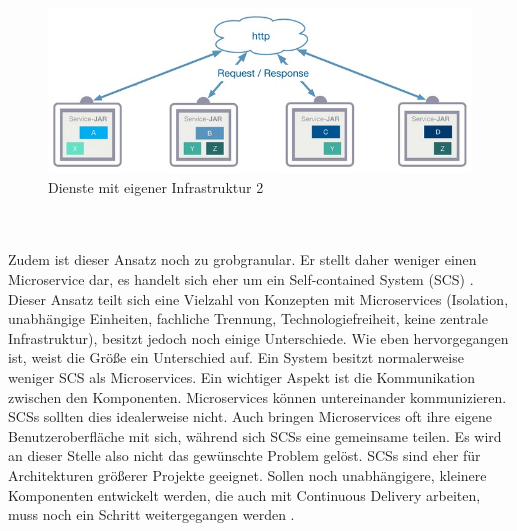 \begin{figure}[h!]
	\centering
	\includegraphics[width=1.0\linewidth]{images/mp3}
	\caption{Dienste mit eigener Infrastruktur 2\cite{LarsRowekamp.2017d}}
	\label{fig:mp22}
\end{figure}
\\ \\Zudem ist dieser Ansatz noch zu grobgranular. Er stellt daher weniger einen Microservice dar, es handelt sich eher um ein Self-contained System (SCS) \cite{jaxcenter.2016}. Dieser Ansatz teilt sich eine Vielzahl von Konzepten mit Microservices (Isolation, unabhängige Einheiten, fachliche Trennung, Technologiefreiheit, keine zentrale Infrastruktur), besitzt jedoch noch einige Unterschiede. Wie eben hervorgegangen ist, weist die Größe ein Unterschied auf. Ein System besitzt normalerweise weniger SCS als Microservices. Ein wichtiger Aspekt ist die Kommunikation zwischen den Komponenten. Microservices können untereinander kommunizieren. SCSs sollten dies idealerweise nicht. Auch bringen Microservices oft ihre eigene Benutzeroberfläche mit sich, während sich SCSs eine gemeinsame teilen. Es wird an dieser Stelle also nicht das gewünschte Problem gelöst. SCSs sind eher für Architekturen größerer Projekte geeignet. Sollen noch unabhängigere, kleinere Komponenten entwickelt werden, die auch mit Continuous Delivery arbeiten, muss noch ein Schritt weitergegangen werden \cite{selfcontainedservices.2017}.

 